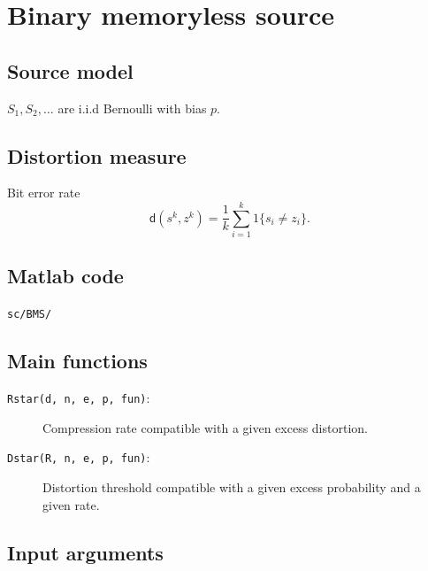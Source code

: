 \documentclass[a4paper,11p]{memoir}
\begin{document}
\section{Binary memoryless source}

\subsection{Source model}
$ S_1, S_2, \ldots $ are i.i.d Bernoulli with bias $p$. 

\subsection{Distortion measure}
Bit error rate $$\mathsf d(s^k, z^k) = \frac 1 k \sum_{i = 1}^k 1\{s_i \neq z_i\}.$$

\subsection{Matlab code}
 \verb|sc/BMS/|


\subsection{Main functions}
\begin{description}
\item[\texttt{Rstar(d, n, e, p, fun)}:]  Compression rate compatible with a given excess distortion. 
\item[\texttt{Dstar(R, n, e, p, fun)}:]  Distortion threshold compatible with a given excess probability and a given rate. 
\end{description}

\subsection{Input arguments}
\end{document}
